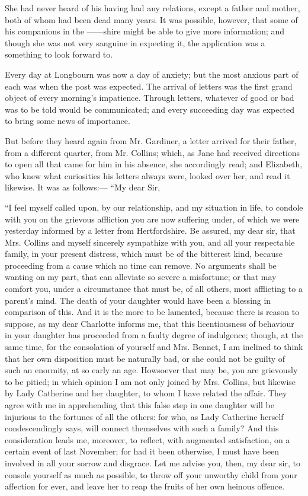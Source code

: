 She had never heard of his having had any relations, except a father and mother, both of whom had been dead many years. It was possible, however, that some of his companions in the ------shire might be able to give more information; and though she was not very sanguine in expecting it, the application was a something to look forward to.

Every day at Longbourn was now a day of anxiety; but the most anxious part of each was when the post was expected. The arrival of letters was the first grand object of every morning's impatience. Through letters, whatever of good or bad was to be told would be communicated; and every succeeding day was expected to bring some news of importance.

But before they heard again from Mr. Gardiner, a letter arrived for their father, from a different quarter, from Mr. Collins; which, as Jane had received directions to open all that came for him in his absence, she accordingly read; and Elizabeth, who knew what curiosities his letters always were, looked over her, and read it likewise. It was as follows:---
``My dear Sir,

    ``I feel myself called upon, by our relationship, and my situation in life, to condole with you on the grievous affliction you are now suffering under, of which we were yesterday informed by a letter from Hertfordshire. Be assured, my dear sir, that Mrs. Collins and myself sincerely sympathize with you, and all your respectable family, in your present distress, which must be of the bitterest kind, because proceeding from a cause which no time can remove. No arguments shall be wanting on my part, that can alleviate so severe a misfortune; or that may comfort you, under a circumstance that must be, of all others, most afflicting to a parent's mind. The death of your daughter would have been a blessing in comparison of this. And it is the more to be lamented, because there is reason to suppose, as my dear Charlotte informs me, that this licentiousness of behaviour in your daughter has proceeded from a faulty degree of indulgence; though, at the same time, for the consolation of yourself and Mrs. Bennet, I am inclined to think that her own disposition must be naturally bad, or she could not be guilty of such an enormity, at so early an age. Howsoever that may be, you are grievously to be pitied; in which opinion I am not only joined by Mrs. Collins, but likewise by Lady Catherine and her daughter, to whom I have related the affair. They agree with me in apprehending that this false step in one daughter will be injurious to the fortunes of all the others: for who, as Lady Catherine herself condescendingly says, will connect themselves with such a family? And this consideration leads me, moreover, to reflect, with augmented satisfaction, on a certain event of last November; for had it been otherwise, I must have been involved in all your sorrow and disgrace. Let me advise you, then, my dear sir, to console yourself as much as possible, to throw off your unworthy child from your affection for ever, and leave her to reap the fruits of her own heinous offence.

